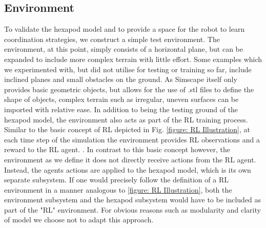 \begin{comment}
The  thorax is represented by a rigid body and a main coordinate frame.
Each of the robots legs consists of 3 rigid bodies(coxa, femur and tibia) which are connected to each other by 2 joints.
A third joint then attaches the coxa and the leg as a whole to the main body.
Like the leg of an insect, the movement plane of the joint connecting coxa and thorax is parallel to the ground and orthogonal towards the other two joints.
Each of the joints used has 1 (rotational) DoF.
To position each rigid body and joint correctly, rigid transformations are used to translate and rotate each component.

As mentioned above, joints can receive as input a torque to be applied and can output sensory data, such as the joints position, velocity and acceleration. 
\end{comment}



\subsection{Environment}
To validate the hexapod model and to provide a space for the robot to learn coordination strategies, we construct a simple test environment.
The environment, at this point, simply consists of a horizontal plane, but can be expanded to include more complex terrain with little effort.
Some examples which we experimented with, but did not utilise for testing or training so far, include inclined planes and small obstacles on the ground.
As Simscape itself only provides basic geometric objects, but allows for the use of .stl files to define the shape of objects, complex terrain such as irregular, uneven surfaces can be imported with relative ease. 
In addition to being the testing ground of the hexapod model, the environment also acts as part of the RL training process.
Similar to the basic concept of RL depicted in Fig. \ref{figure: RL Illustration}, at each time step of the simulation the environment provides RL observations and a reward to the RL agent. .
In contrast to this basic concept however, the environment as we define it does not directly receive actions from the RL agent.
Instead, the agents actions are applied to the hexapod model, which is its own separate subsystem.
If one would precisely follow the definition of a RL environment in a manner analogous to \ref{figure: RL Illustration}, both the environment subsystem and the hexapod subsystem would have to be included as part of the "RL" environment.
For obvious reasons such as modularity and clarity of model we choose not to adapt this approach.


